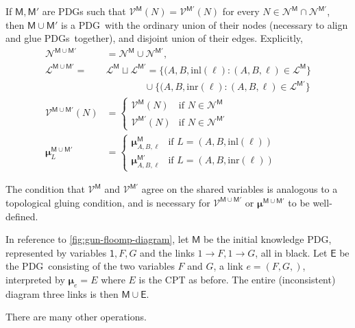 \documentclass{article}
\newcommand\bmu{\boldsymbol{\mu}}
\newcommand{\V}{\mathcal V}
\newcommand{\N}{\mathcal N}
\newcommand{\Li}{\mathcal L}
\newcommand{\sfM}{\mathsf M}
\newcommand{\MN}{PDG}
\newcommand{\MNs}{\MN s}
\begin{document}
	\begin{defn}[union] \label{def:model-union}
		If $\sfM, \sfM'$ are \MN s such that $\V^\sfM(N) = \V^{\sfM'}(N)$ for every $N \in  \N^{\sfM} \cap \N^{\sfM'}$, then $\sfM \cup \sfM'$ is a \MN\ with the ordinary union of their nodes (necessary to align and glue \MNs\ together), and disjoint union of their edges. Explicitly,
		\begin{align*}
			\N^{\sfM \cup \sfM'} &= \N^\sfM \cup \N^{\sfM'},  \\
			\Li^{\sfM \cup \sfM'} \!=& \Li^\sfM \sqcup \Li^{\sfM'}\!
				=  \{ (A, B, \text{inl}(\ell) : (A,B,\ell)\in \Li^\sfM \}  \\
					&\qquad\qquad \cup \{ (A, B, \text{inr}(\ell) : (A,B,\ell)\in \Li^{\sfM'} \} \\ 
			\V^{\sfM \cup \sfM'} (N) &= \begin{cases}
					\V^{\sfM}(N) & \text{if }N \in \N^\sfM \\
					\V^{\sfM'}(N) &\text{if }N \in \N^{\sfM'} 
				\end{cases}\\
			\bmu^{\sfM \cup \sfM'}_L &= \begin{cases}
				\bmu^{\sfM}_{A, B, \ell} &\text{if } L = (A, B, \text{inl} (\ell)) \\
				\bmu^{\sfM'}_{A, B, \ell} &\text{if } L = (A, B, \text{inr} (\ell)) 
			\end{cases}
		\end{align*}
		
		 
	\end{defn}
	The condition that $\V^\sfM$ and $\V^{\sfM'}$ agree on the shared variables is analogous to a topological gluing condition, and is necessary for $\V^{\sfM\cup \sfM'}$ or $\bmu^{\sfM \cup \sfM'}$ to be well-defined.
	
	\begin{example}[continues=ex:guns-and-floomps]
		In reference to \cref{fig:gun-floomp-diagram}, let $\sfM$ be the initial knowledge \MN, represented by variables $\mathsf 1, F, G$ and the links $1\to F,1\to G$, all in black. Let $\mathsf E$ be the \MN\ consisting of the two variables $F$ and $G$, a link $e = (F, G,)$, interpreted by $\bmu_{e} = E$ where $E$ is the CPT as before. The entire (inconsistent) diagram three links is then
		$ \sfM \cup \mathsf E$.
	\end{example}

	There are many other operations. 
	
\end{document}
